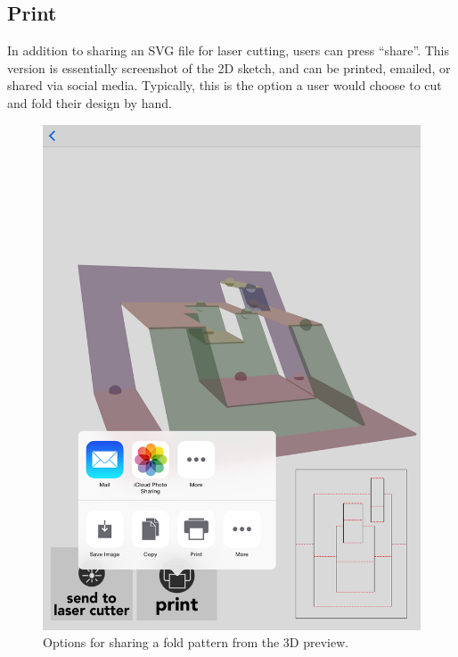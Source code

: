 \subsection{Print}\label{print}

In addition to sharing an SVG file for laser cutting, users can press
``share''. This version is essentially screenshot of the 2D sketch, and
can be printed, emailed, or shared via social media. Typically, this is
the option a user would choose to cut and fold their design by hand.

\begin{figure}[htbp]
\centering
\includegraphics{figures/32_UI_Tool_Interactions/3d-share.png}
\caption{Options for sharing a fold pattern from the 3D preview.}
\end{figure}
